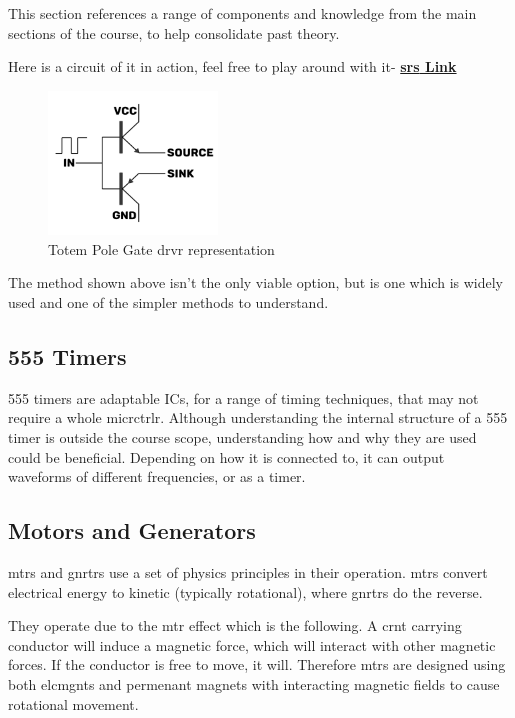 \documentclass[a4paper,11pt]{report}
\let\oldhref\href %
\renewcommand{\href}[2]{\oldhref{#1}{\bf\gls{srs} #2}}
\begin{document}
This section references a range of components and knowledge from the main sections of the course, to help consolidate past theory.

Here is a circuit of it in action, feel free to play around with it- \href{https://tinyurl.com/2m77d6zl}{Link}

\begin{figure}[H]
\centering
\includegraphics[width=0.4\textwidth]{gatedriver1}
\caption{Totem Pole Gate \gls{drvr} representation}
\end{figure}

The method shown above isn't the only viable option, but is one which is widely used and one of the simpler methods to understand.

\vspace*{1\baselineskip}

\subsection{555 Timers}

555 timers are adaptable ICs, for a range of timing techniques, that may not require a whole \gls{micrctrlr}. Although understanding the internal structure of a 555 timer is outside the course scope, understanding how and why they are used could be beneficial.
Depending on how it is connected to, it can output waveforms of different frequencies, or as a timer.

\vspace*{1\baselineskip}

\subsection{Motors and Generators}

\gls{mtr}s and \gls{gnrtr}s use a set of physics principles in their operation. \gls{mtr}s convert electrical energy to kinetic (typically rotational), where \gls{gnrtr}s do the reverse.

They operate due to the \gls{mtr} effect which is the following. A \gls{crnt} carrying conductor will induce a magnetic force, which will interact with other magnetic forces. If the conductor is free to move, it will. Therefore \gls{mtr}s are designed using both \gls{elcmgnt}s and permenant magnets with interacting magnetic fields to cause rotational movement.
\end{document}
